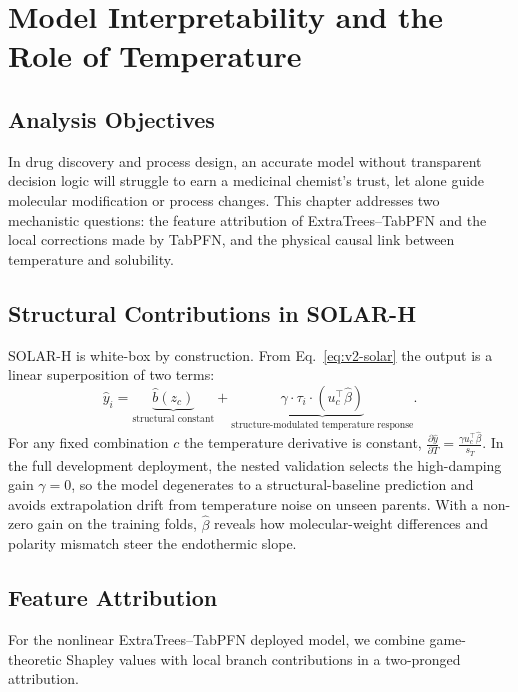 \section{Model Interpretability and the Role of Temperature}

\subsection{Analysis Objectives}

In drug discovery and process design, an accurate model without transparent decision logic will struggle to earn a medicinal chemist's trust, let alone guide molecular modification or process changes. This chapter addresses two mechanistic questions: the feature attribution of ExtraTrees--TabPFN and the local corrections made by TabPFN, and the physical causal link between temperature and solubility.

\subsection{Structural Contributions in SOLAR-H}

SOLAR-H is white-box by construction. From Eq.~\eqref{eq:v2-solar} the output is a linear superposition of two terms:
\begin{equation}
\widehat y_i = \underbrace{\widehat b(z_c)}_{\text{structural constant}} + \underbrace{\gamma \cdot \tau_i \cdot \left( u_c^\top \widehat\beta \right)}_{\text{structure-modulated temperature response}}.
\end{equation}
For any fixed combination $c$ the temperature derivative is constant, $\frac{\partial \widehat y}{\partial T} = \frac{\gamma u_c^\top \widehat\beta}{s_T}$. In the full development deployment, the nested validation selects the high-damping gain $\gamma = 0$, so the model degenerates to a structural-baseline prediction and avoids extrapolation drift from temperature noise on unseen parents. With a non-zero gain on the training folds, $\widehat\beta$ reveals how molecular-weight differences and polarity mismatch steer the endothermic slope.

\subsection{Feature Attribution}\label{sec:deployment-explanations}

For the nonlinear ExtraTrees--TabPFN deployed model, we combine game-theoretic Shapley values with local branch contributions in a two-pronged attribution.

